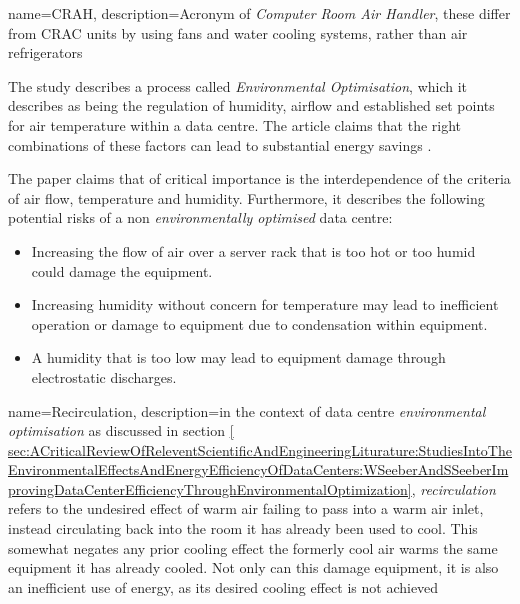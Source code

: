 {
  name=CRAH,
  description={Acronym of \emph{Computer Room Air Handler}, these differ from CRAC units by using fans and water cooling systems, rather than air refrigerators \cite{CRAHDefinition-SearchDataCenter}}
}

The study describes a process called \emph{Environmental Optimisation}, which it describes as being the regulation of humidity, airflow and established set points for air temperature within a \gls{data centre}. The article claims that the right combinations of these factors can lead to substantial energy savings \cite[abstract]{ SeeberAndSeeberImprovingDataCenterEnergyEfficiencyThroughEnvironmentalOptimization}.

The paper claims that of critical importance is the interdependence of the criteria of air flow, temperature and humidity. Furthermore, it describes the following potential risks of a non \emph{environmentally optimised} data centre:

\begin{itemize}

\item Increasing the flow of air over a server rack that is too hot or too humid could damage the equipment.

\item Increasing humidity without concern for temperature may lead to inefficient operation or damage to equipment due to condensation within equipment.

\item A humidity that is too low may lead to equipment damage through electrostatic discharges.

\end{itemize}

{
  name=Recirculation,
  description={in the context of data centre \emph{environmental optimisation} as discussed in section \ref{ sec:ACriticalReviewOfReleventScientificAndEngineeringLiturature:StudiesIntoTheEnvironmentalEffectsAndEnergyEfficiencyOfDataCenters:WSeeberAndSSeeberImprovingDataCenterEfficiencyThroughEnvironmentalOptimization}, \emph{recirculation} refers to the undesired effect of warm air failing to pass into a warm air inlet, instead circulating back into the room it has already been used to cool. This somewhat negates any prior cooling effect the formerly cool air warms the same equipment it has already cooled. Not only can this damage equipment, it is also an inefficient use of energy, as its desired cooling effect is not achieved \cite{SeeberAndSeeberImprovingDataCenterEnergyEfficiencyThroughEnvironmentalOptimization}\cite{BanuelosManagingDataCentreHeatIssues}}
}

